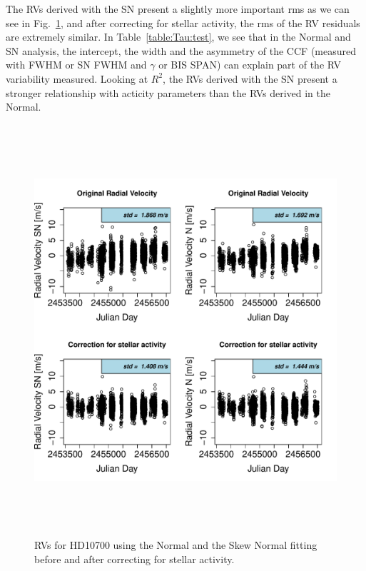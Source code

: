 \documentclass[11pt, oneside]{article}
\begin{document}
The RVs derived with the SN present a slightly more important rms as we can see in Fig.~\ref{fig:Tau:correctionRV}, and after correcting for stellar activity, the rms of the RV residuals are extremely similar. In Table~\ref{table:Tau:test}, we see that in the Normal and SN analysis, the intercept, the width and the asymmetry of the CCF (measured with FWHM or SN FWHM and $\gamma$ or BIS SPAN) can explain part of the RV variability measured. Looking at $R^2$, the RVs derived with the SN present a stronger relationship with acticity parameters than the RVs derived in the Normal.
%
\begin{figure}[htbp]
   \centering
\includegraphics[height = 6in]{HD10700_[3]CorrectionActivity_RadialVelocity_vs_time.pdf} 
   \caption{RVs for HD10700 using the Normal and the Skew Normal fitting before and after correcting for stellar activity.}
   \label{fig:Tau:correctionRV}
\end{figure}
%
\end{document}
